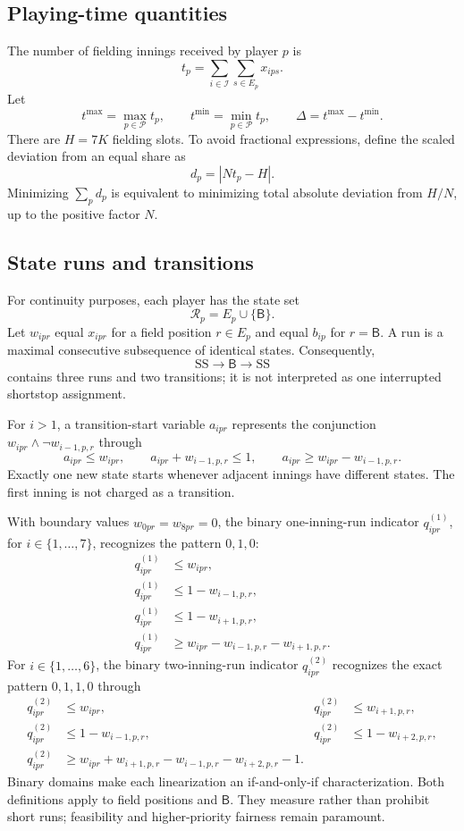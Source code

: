 \documentclass[11pt]{article}
\newcommand{\Bench}{\mathsf{B}}
\begin{document}
\subsection{Playing-time quantities}

The number of fielding innings received by player $p$ is
\[
t_p=\sum_{i\in\mathcal{I}}\sum_{s\in E_p}x_{ips}.
\]
Let
\[
t^{\max}=\max_{p\in\mathcal{P}}t_p,
\qquad
t^{\min}=\min_{p\in\mathcal{P}}t_p,
\qquad
\Delta=t^{\max}-t^{\min}.
\]
There are $H=7K$ fielding slots. To avoid fractional expressions, define the
scaled deviation from an equal share as
\[
d_p=\left|Nt_p-H\right|.
\]
Minimizing $\sum_p d_p$ is equivalent to minimizing total absolute deviation
from $H/N$, up to the positive factor $N$.

\subsection{State runs and transitions}

For continuity purposes, each player has the state set
\[
\mathcal{R}_p=E_p\cup\{\Bench\}.
\]
Let $w_{ipr}$ equal $x_{ipr}$ for a field position $r\in E_p$ and equal
$b_{ip}$ for $r=\Bench$. A run is a maximal consecutive subsequence of
identical states. Consequently,
\[
\mathrm{SS}\rightarrow\Bench\rightarrow\mathrm{SS}
\]
contains three runs and two transitions; it is not interpreted as one
interrupted shortstop assignment.

For $i>1$, a transition-start variable $a_{ipr}$ represents the conjunction
$w_{ipr}\land\neg w_{i-1,p,r}$ through
\[
a_{ipr}\leq w_{ipr},\qquad
a_{ipr}+w_{i-1,p,r}\leq1,\qquad
a_{ipr}\geq w_{ipr}-w_{i-1,p,r}.
\]
Exactly one new state starts whenever adjacent innings have different states.
The first inning is not charged as a transition.

With boundary values $w_{0pr}=w_{8pr}=0$, the binary one-inning-run indicator
$q^{(1)}_{ipr}$, for $i\in\{1,\ldots,7\}$, recognizes the pattern $0,1,0$:
\[
\begin{aligned}
q^{(1)}_{ipr}&\leq w_{ipr},\\
q^{(1)}_{ipr}&\leq 1-w_{i-1,p,r},\\
q^{(1)}_{ipr}&\leq 1-w_{i+1,p,r},\\
q^{(1)}_{ipr}&\geq
w_{ipr}-w_{i-1,p,r}-w_{i+1,p,r}.
\end{aligned}
\]
For $i\in\{1,\ldots,6\}$, the binary two-inning-run indicator
$q^{(2)}_{ipr}$ recognizes the exact pattern $0,1,1,0$ through
\[
\begin{aligned}
q^{(2)}_{ipr}&\leq w_{ipr}, &
q^{(2)}_{ipr}&\leq w_{i+1,p,r},\\
q^{(2)}_{ipr}&\leq 1-w_{i-1,p,r}, &
q^{(2)}_{ipr}&\leq 1-w_{i+2,p,r},\\
q^{(2)}_{ipr}&\geq w_{ipr}+w_{i+1,p,r}
                -w_{i-1,p,r}-w_{i+2,p,r}-1.
\end{aligned}
\]
Binary domains make each linearization an if-and-only-if characterization.
Both definitions apply to field positions and $\Bench$. They measure rather
than prohibit short runs; feasibility and higher-priority fairness remain
paramount.
\end{document}
